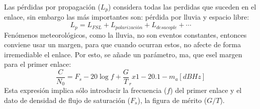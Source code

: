 \documentclass[
	12pt, %
	fleqn, %
	a4paper, %
	oneside, %
]{LegrandOrangeBook}
\begin{document}
Las pérdidas por propagación ($L_p$) considera todas las perdidas que suceden en el enlace, sin embargo las más importantes son: pérdida por lluvia y espacio libre:
\begin{equation}
L_p=L_{FSL}+L_{polarización}+L_{desacople}+\cdots
\label{eq:perdidas total por prop}
\end{equation}
Fenómenos meteorológicos, como la lluvia, no son eventos constantes, entonces conviene usar un margen, para que cuando ocurran estos, no afecte de forma irremediable el enlace. Por esto, se añade un parámetro, ma, que esel margen para el primer enlace:
\begin{equation}
\frac{C}{N_0}=F_s-20\log f+\frac{G}{T}_rx1-20.1-m_a [dBHz]
\end{equation}
Esta expresión implica sólo introducir la frecuencia ($f$) del primer enlace y el dato de densidad de flujo de saturación ($F_s$), la figura de mérito ($G/T$).
\end{document}
